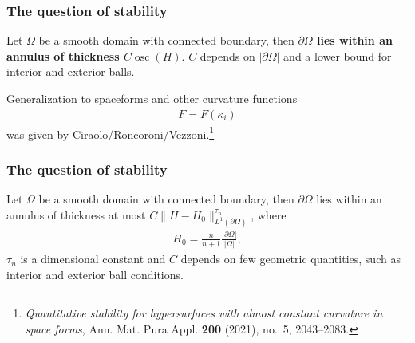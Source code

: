 \documentclass{beamer}
\newcommand{\bbR}{\mathbb{R}}
\newcommand{\8}{\infty}
\newcommand{\ka}{\kappa}
\newcommand{\Om}{\Omega}
\newcommand{\del}{\partial}
\newcommand{\fr}[2]{\frac{#1}{#2}}
\DeclareMathOperator{\osc}{osc}
\newcommand{\eq}[1]{\begin{equation}\begin{alignedat}{2} #1 \end{alignedat}\end{equation}}
\newcommand{\abs}[1]{\lvert #1\rvert}
\begin{document}
\begin{frame} 
\frametitle{The question of stability}

\begin{theorem}
Let $\Om$ be a smooth domain with connected boundary, then {\bf{$\del\Om$ lies within an annulus of thickness $C\osc(H)$}}. $C$ depends on $\abs{\del\Om}$ and a lower bound for interior and exterior balls.
\end{theorem}

 Generalization to spaceforms and other curvature functions
\eq{F=F(\ka_{i})}
was given by Ciraolo/Roncoroni/Vezzoni.\footnote{\emph{Quantitative
  stability for hypersurfaces with almost constant curvature in space forms},
  Ann. Mat. Pura Appl. \textbf{200} (2021), no.~5, 2043--2083.}


\end{frame}




\begin{frame} 
\frametitle{The question of stability}

\begin{theorem}
Let $\Om$ be a smooth domain with connected boundary, then $\del\Om$ lies within an annulus of thickness at most $C\|H-H_{0}\|_{L^{1}(\del\Om)}^{\tau_{n}}$, where
\eq{H_{0} = \fr{n}{n+1}\fr{\abs{\del\Om}}{\abs{\Om}},}
 $\tau_{n}$ is a dimensional constant and $C$ depends on few geometric quantities, such as interior and exterior ball conditions.

\end{theorem}
\end{frame}
\end{document}
